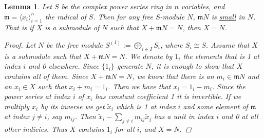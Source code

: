 \documentclass[11pt, a4paper, english]{article}
\numberwithin{prop}{section}
\newtheorem{lemma}{Lemma}
\numberwithin{lemma}{section}
\numberwithin{theorem}{section}
\numberwithin{defin}{section}
\numberwithin{example}{section}
\begin{document}
\begin{lemma}
\label{lem:radical small}
Let $S$ be the complex power series ring in $n$ variables, and $\mathfrak{m} = \langle x_i \rangle_{i=1}^n$ the radical of $S$. Then for any free $S$-module $N$, $\mathfrak{m}N$ is \underline{small} in $N$. That is if $X$ is  a submodule of $N$ such that $X + \mathfrak{m}N = N$, then $X = N$.

\begin{proof}
Let $N$ be the free module $S^{(I)} := \bigoplus\limits_{i \in I} S_i$, where $S_i \cong S$. Assume that $X$ is a submodule such that $X + \mathfrak{m}N = N$. We denote by $1_i$ the elements that is 1 at index $i$ and 0 elsewhere. Since $\{ 1_i \}$ generate $N$, it is enough to show that $X$ contains all of them. Since $X + \mathfrak{m}N = N$, we know that there is an $m_i \in \mathfrak{m}N$ and an $x_i \in X$ such that $x_i + m_i = 1_i$. Then we have that $x_i = 1_i - m_i$. Since the power series at index $i$ of $x_i$ has constant coefficient 1 it is invertible. If we multiply $x_i$ by its inverse we get $\tilde{x}_i$ which is 1 at index $i$ and some element of $\mathfrak{m}$ at index $j \neq i$, say $m_{ij}$. Then $\tilde{x}_i - \sum\limits_{j \neq i} m_{ij}\tilde{x}_j$ has a unit in index $i$ and 0 at all other indicies. Thus $X$ contains $1_i$ for all $i$, and $X = N$.
\end{proof}
\end{lemma}
\end{document}
